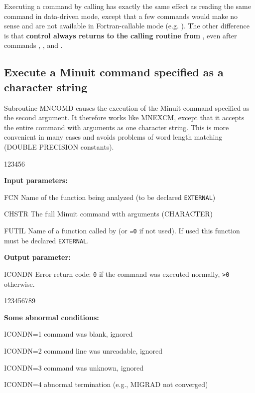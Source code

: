 Executing a command by calling  has exactly the same
effect as reading the same command in data-driven mode, except that
a few commands would make no sense and are not available in
Fortran-callable mode (e.g. ).
The other difference is that {\bf control always returns to the
calling routine from }, even after commands ,
, and .

\subsection{Execute a Minuit command specified as a character string}
   Subroutine MNCOMD causes the execution of the Minuit command specified
as the second argument.  It therefore works like MNEXCM, except that it
accepts the entire command with arguments as one character string.
This is more convenient in many cases and avoids problems of word length
matching (DOUBLE PRECISION constants).


\begin{DLtt}{123456}
\item[{\rm\bf Input parameters:}]
\item[FCN]    Name of the function being analyzed (to be declared \texttt{EXTERNAL})
\item[CHSTR]  The full Minuit command with arguments (CHARACTER)
\item[FUTIL]  Name of a function called by  (or \texttt{=0} if not used).
              If used this function must be declared \texttt{EXTERNAL}.
\item[{\rm\bf Output parameter:}]
\item[ICONDN] Error return code: \texttt{0} if the command was executed normally, 
              \texttt{>0} otherwise.
\end{DLtt}
 
\begin{DLtt}{123456789}
\item[{\rm\bf Some abnormal conditions:}]
\item[ICONDN=1]  command was blank, ignored
\item[ICONDN=2]  command line was unreadable, ignored
\item[ICONDN=3]  command was unknown, ignored
\item[ICONDN=4]  abnormal termination (e.g., MIGRAD not converged)
\end{DLtt}
 
